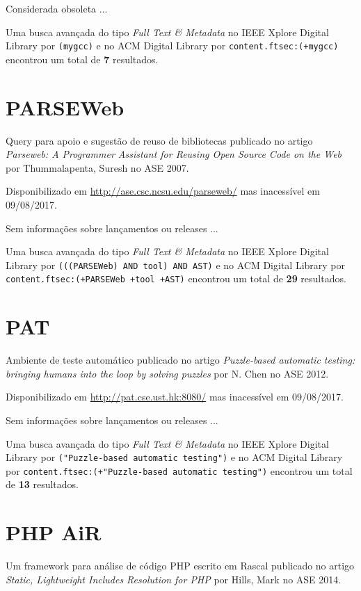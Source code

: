 Considerada obsoleta ...


Uma busca avançada do tipo {\it Full Text \& Metadata} no IEEE Xplore Digital Library por
\texttt{(mygcc)}
e no ACM Digital Library por
\texttt{content.ftsec:(+mygcc)}
encontrou um total de
{\bf 7}
resultados.

\section{PARSEWeb}

Query para apoio e sugestão de reuso de bibliotecas
publicado no artigo {\it Parseweb: A Programmer Assistant for Reusing Open Source Code on the Web}
por Thummalapenta, Suresh
no ASE 2007.

Disponibilizado em \url{http://ase.csc.ncsu.edu/parseweb/}
mas inacessível em 09/08/2017.

Sem informações sobre lançamentos ou releases ...


Uma busca avançada do tipo {\it Full Text \& Metadata} no IEEE Xplore Digital Library por
\texttt{(((PARSEWeb) AND tool) AND AST)}
e no ACM Digital Library por
\texttt{content.ftsec:(+PARSEWeb +tool +AST)}
encontrou um total de
{\bf 29}
resultados.

\section{PAT}

Ambiente de teste automático
publicado no artigo {\it Puzzle-based automatic testing: bringing humans into the loop by solving puzzles}
por N. Chen
no ASE 2012.

Disponibilizado em \url{http://pat.cse.ust.hk:8080/}
mas inacessível em 09/08/2017.

Sem informações sobre lançamentos ou releases ...


Uma busca avançada do tipo {\it Full Text \& Metadata} no IEEE Xplore Digital Library por
\texttt{("Puzzle-based automatic testing")}
e no ACM Digital Library por
\texttt{content.ftsec:(+"Puzzle-based automatic testing")}
encontrou um total de
{\bf 13}
resultados.

\section{PHP AiR}

Um framework para análise de código PHP escrito em Rascal
publicado no artigo {\it Static, Lightweight Includes Resolution for PHP}
por Hills, Mark
no ASE 2014.

